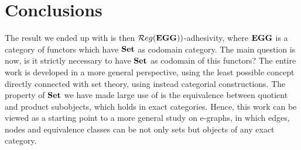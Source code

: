\chapter*{Conclusions}


The result we ended up with is then $\mathcal{R}eg(\mathbf{EGG}))$-adhesivity, where $\mathbf{EGG}$ is a category of functors which have $\mathbf{Set}$ as codomain category.
The main question is now, is it strictly necessary to have $\mathbf{Set}$ as codomain of this functors? The entire work is developed in a more general perspective, using the least possible concept directly connected with set theory, using instead categorial constructions. The property of $\mathbf{Set}$ we have made large use of is the equivalence between quotient and product subobjects, which holds in exact categories.
Hence, this work can be viewed as a starting point to a more general study on e-graphs, in which edges, nodes and equivalence classes can be not only sets but objects of any exact category.


